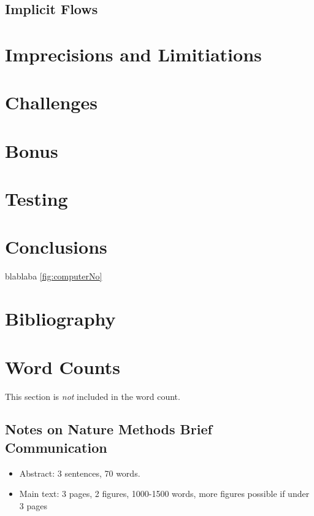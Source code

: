\documentclass[times, twoside, watermark]{zHenriquesLab-StyleBioRxiv}
\begin{document}
\subsection*{Implicit Flows}


\section*{Imprecisions and Limitiations}

\section*{Challenges}

\section*{Bonus}

\section*{Testing}

\section*{Conclusions}

blablaba \ref{fig:computerNo} 
\blindtext

\section*{Bibliography}


\onecolumn
\newpage

\section*{Word Counts}
This section is \textit{not} included in the word count. 
\subsection*{Notes on Nature Methods Brief Communication}
\begin{itemize}
\item Abstract: 3 sentences, 70 words.
\item Main text: 3 pages, 2 figures, 1000-1500 words, more figures possible if under 3 pages
\end{itemize}
\end{document}
